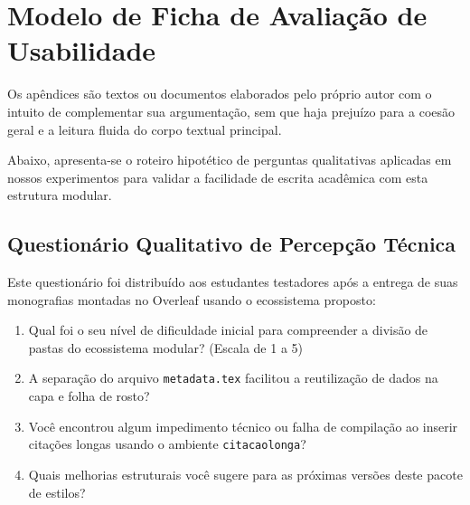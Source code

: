 
\chapter{Modelo de Ficha de Avaliação de Usabilidade}
\label{apendice:ficha_avaliacao}

Os apêndices são textos ou documentos elaborados pelo próprio autor com o intuito de complementar sua argumentação, sem que haja prejuízo para a coesão geral e a leitura fluida do corpo textual principal.

Abaixo, apresenta-se o roteiro hipotético de perguntas qualitativas aplicadas em nossos experimentos para validar a facilidade de escrita acadêmica com esta estrutura modular.

\section{Questionário Qualitativo de Percepção Técnica}

Este questionário foi distribuído aos estudantes testadores após a entrega de suas monografias montadas no Overleaf usando o ecossistema proposto:

\begin{enumerate}
  \item Qual foi o seu nível de dificuldade inicial para compreender a divisão de pastas do ecossistema modular? (Escala de 1 a 5)
  \item A separação do arquivo \texttt{metadata.tex} facilitou a reutilização de dados na capa e folha de rosto?
  \item Você encontrou algum impedimento técnico ou falha de compilação ao inserir citações longas usando o ambiente \texttt{citacaolonga}?
  \item Quais melhorias estruturais você sugere para as próximas versões deste pacote de estilos?
\end{enumerate}
